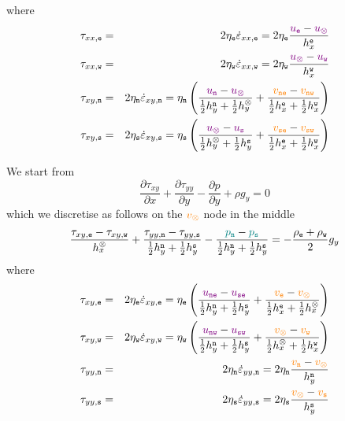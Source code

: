 where
\begin{eqnarray}
\tau_{xx,{\tt e}} 
&=& 2 \eta_{\tt e} \dot{\varepsilon}_{xx,{\tt e}} 
= 2\eta_{\tt e} \frac{{\color{violet} u_{\tt e}}-{\color{violet} u_\otimes}}{h_x^{\tt e}} 
\nonumber \\
\tau_{xx,{\tt w}} 
&=& 2 \eta_{\tt w} \dot{\varepsilon}_{xx,{\tt w}} 
= 2\eta_{\tt w} \frac{{\color{violet} u_\otimes}-{\color{violet} u_{\tt w}}}{h_x^{\tt w}} 
\nonumber\\
\tau_{xy,{\tt n}} &=& 2 \eta_{\tt n} \dot{\varepsilon}_{xy,{\tt n}} 
= \eta_{\tt n} \left( \frac{{\color{violet} u_{\tt n}}-{\color{violet} u_\otimes}}{\frac12 h_y^{\tt n} + \frac12 h_y^\otimes} 
+\frac{{\color{orange} v_{\tt ne}}-{\color{orange} v_{\tt nw}}}{\frac12 h_x^{\tt e} + \frac12 h_x^{\tt w}} \right) 
\nonumber\\
\tau_{xy,{\tt s}} &=& 2 \eta_{\tt s} \dot{\varepsilon}_{xy,{\tt s}} 
= \eta_{\tt s} \left( \frac{{\color{violet} u_\otimes}-{\color{violet} u_{\tt s}}}{\frac12 h_y^\otimes + \frac12 h_y^{\tt s}} 
+\frac{{\color{orange}v_{\tt se}}-{\color{orange} v_{\tt sw}}}{\frac12 h_x^{\tt e} + \frac12 h_x^{\tt w}} \right)  \nonumber
\end{eqnarray}










We start from
\[
\frac{\partial \tau_{xy}}{\partial x}  + 
\frac{\partial \tau_{yy}}{\partial y}  
- \frac{\partial p}{\partial y} + \rho g_y = 0
\]
which we discretise as follows on the ${\color{orange} v_\otimes}$ node in the middle
\[
\frac{\tau_{xy,{\tt e}}-\tau_{xy,{\tt w}}}{h_x^\otimes} 
+ \frac{\tau_{yy,{\tt n}}-\tau_{yy,{\tt s}}}{\frac12 h_y^{\tt n} + \frac12 h_y^{\tt s}} 
-\frac{{\color{teal}p_{\tt n}}-{\color{teal}p_{\tt s}}}{\frac12 h_y^{\tt n} + \frac12 h_y^{\tt s}} 
= -\frac{\rho_{\tt e}+\rho_{\tt w}}{2} g_y
\]
where
\begin{eqnarray}
\tau_{xy,{\tt e}} 
&=& 2 \eta_{\tt e} \dot{\varepsilon}_{xy,{\tt e}} 
= \eta_{\tt e} \left( \frac{{\color{violet} u_{\tt ne}}-{\color{violet} u_{\tt se}}}{\frac12 h_y^{\tt n} + \frac12 h_y^{\tt s}} 
+\frac{{\color{orange} v_{\tt e}}-{\color{orange} v_\otimes}}{\frac12 h_x^{\tt e} + \frac12 h_x^{\otimes}} \right) 
\nonumber \\
\tau_{xy,{\tt w}} 
&=& 2 \eta_{\tt w} \dot{\varepsilon}_{xy,{\tt w}} 
= \eta_{\tt w} \left( \frac{{\color{violet} u_{\tt nw}}-{\color{violet} u_{\tt sw}}}{\frac12 h_y^{\tt n} + \frac12 h_y^{\tt s}} 
+\frac{{\color{orange} v_\otimes} - {\color{orange} v_{\tt w}}}{\frac12 h_x^{\otimes} + \frac12 h_x^{\tt w}} \right) 
\nonumber\\
\tau_{yy,{\tt n}} 
&=& 2 \eta_{\tt n} \dot{\varepsilon}_{yy,{\tt n}} 
= 2\eta_{\tt n} \frac{{\color{orange} v_{\tt n}}-{\color{orange} v_\otimes}}{h_y^{\tt n}} 
\nonumber\\
\tau_{yy,{\tt s}} 
&=& 2 \eta_{\tt s} \dot{\varepsilon}_{yy,{\tt s}} 
= 2\eta_{\tt s} \frac{{\color{orange} v_\otimes} -{\color{orange} v_{\tt s}}}{h_y^{\tt s}} 
 \nonumber
\end{eqnarray}



